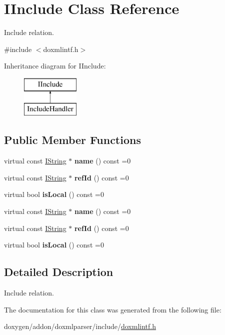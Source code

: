 \hypertarget{class_i_include}{}\section{I\+Include Class Reference}
\label{class_i_include}


Include relation.  




{\ttfamily \#include $<$doxmlintf.\+h$>$}

Inheritance diagram for I\+Include\+:\begin{figure}[H]
\begin{center}
\leavevmode
\includegraphics[height=2.000000cm]{class_i_include}
\end{center}
\end{figure}
\subsection*{Public Member Functions}
\begin{DoxyCompactItemize}
\item 
\mbox{\label{class_i_include_afe0fda4567dc524123cbd1bbf1cd1f22}} 
virtual const \mbox{\hyperlink{class_i_string}{I\+String}} $\ast$ {\bfseries name} () const =0
\item 
\mbox{\label{class_i_include_ab738f8f672628bce7fc2a3405c6f8224}} 
virtual const \mbox{\hyperlink{class_i_string}{I\+String}} $\ast$ {\bfseries ref\+Id} () const =0
\item 
\mbox{\label{class_i_include_ad81fe6fc542d9907adcae804bba45b38}} 
virtual bool {\bfseries is\+Local} () const =0
\item 
\mbox{\label{class_i_include_afe0fda4567dc524123cbd1bbf1cd1f22}} 
virtual const \mbox{\hyperlink{class_i_string}{I\+String}} $\ast$ {\bfseries name} () const =0
\item 
\mbox{\label{class_i_include_ab738f8f672628bce7fc2a3405c6f8224}} 
virtual const \mbox{\hyperlink{class_i_string}{I\+String}} $\ast$ {\bfseries ref\+Id} () const =0
\item 
\mbox{\label{class_i_include_ad81fe6fc542d9907adcae804bba45b38}} 
virtual bool {\bfseries is\+Local} () const =0
\end{DoxyCompactItemize}


\subsection{Detailed Description}
Include relation. 

The documentation for this class was generated from the following file\+:\begin{DoxyCompactItemize}
\item 
doxygen/addon/doxmlparser/include/\mbox{\hyperlink{include_2doxmlintf_8h}{doxmlintf.\+h}}\end{DoxyCompactItemize}
